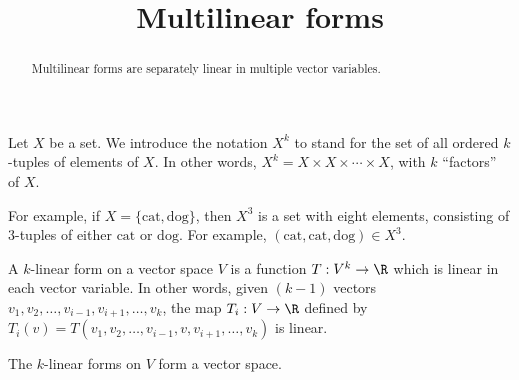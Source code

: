 \documentclass{ximera}
\title{Multilinear forms}
\begin{document}
\begin{abstract}
  Multilinear forms are separately linear in multiple vector variables.
\end{abstract}
	
\begin{definition}
  Let $X$ be a set.  We introduce the notation $X^k$ to stand for the set of all ordered $k$-tuples of elements of $X$.  In other words, $X^k = X \times X \times \cdots \times X$, 
  with $k$ ``factors'' of $X$.
\end{definition}	

For example, if $X = \{ \text{cat}, \text{dog} \}$, then $X^3$ is a
set with eight elements, consisting of $3$-tuples of either
$\text{cat}$ or $\text{dog}$.  For example,
$(\text{cat},\text{cat},\text{dog}) \in X^3$.
	
\begin{definition}
  A $k$-linear  form on a vector space $V$ is a function $T: V^k \to \R$ which is linear in each vector variable.  In other words, given $(k-1)$ vectors
  $v_1,v_2, \ldots ,v_{i-1},v_{i+1}, \ldots ,v_k$, the map $T_i: V \to \R$ defined by $T_i(v) = T(v_1,v_2, \ldots ,v_{i-1},v,v_{i+1}, \ldots ,v_k)$ is linear.
\end{definition}

The $k$-linear forms on $V$ form a vector space.
\end{document}
